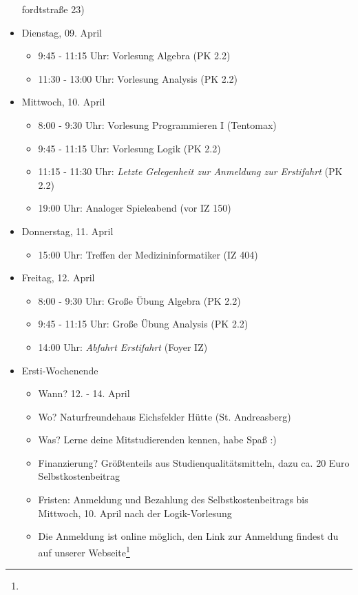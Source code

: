 \begin{itemize}
\begin{itemize}
        \end{itemize}fordtstraße 23)
    \item Dienstag, 09. April
	\begin{itemize}
	    \item 9:45 - 11:15 Uhr: Vorlesung Algebra (PK 2.2)
            \item 11:30 - 13:00 Uhr: Vorlesung Analysis (PK 2.2)
        \end{itemize}
    \item Mittwoch, 10. April
	    \begin{itemize}
	        \item 8:00 - 9:30 Uhr: Vorlesung Programmieren I (Tentomax)
		\item 9:45 - 11:15 Uhr: Vorlesung Logik (PK 2.2)
		\item 11:15 - 11:30 Uhr: \emph{Letzte Gelegenheit zur Anmeldung zur Erstifahrt} (PK 2.2)
	    	\item 19:00 Uhr: Analoger Spieleabend (vor IZ 150)
	    \end{itemize}
    \item Donnerstag, 11. April
	    \begin{itemize}
		    \item 15:00 Uhr: Treffen der Medizininformatiker (IZ 404)
	    \end{itemize}
    \item Freitag, 12. April
	    \begin{itemize}
	         \item 8:00 - 9:30 Uhr: Große Übung Algebra (PK 2.2)
	         \item 9:45 - 11:15 Uhr: Große Übung Analysis (PK 2.2)
	         \item 14:00 Uhr: \emph{Abfahrt Erstifahrt} (Foyer IZ)
	    \end{itemize}
    \item Ersti-Wochenende
        \begin{itemize}
            \item Wann? 12. - 14. April
            \item Wo? Naturfreundehaus Eichsfelder Hütte (St. Andreasberg)
            \item Was? Lerne deine Mitstudierenden kennen, habe Spaß :)
            \item Finanzierung? Größtenteils aus Studienqualitätsmitteln, dazu ca. 20 Euro Selbstkostenbeitrag
            \item Fristen: Anmeldung und Bezahlung des Selbstkostenbeitrags bis Mittwoch, 10. April nach der Logik-Vorlesung
            \item Die Anmeldung ist online möglich, den Link zur Anmeldung findest du auf unserer Webseite\footnote{}
        \end{itemize}
\end{itemize}
